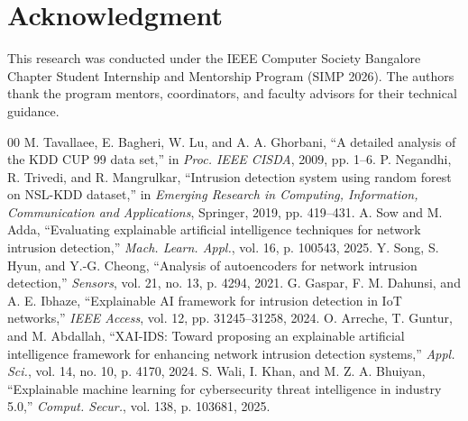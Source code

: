 \documentclass[10pt,twocolumn]{article}
\begin{document}
\section*{Acknowledgment}
This research was conducted under the IEEE Computer Society Bangalore Chapter Student Internship and Mentorship Program (SIMP 2026). The authors thank the program mentors, coordinators, and faculty advisors for their technical guidance.

\begin{thebibliography}{00}
 M. Tavallaee, E. Bagheri, W. Lu, and A. A. Ghorbani, ``A detailed analysis of the KDD CUP 99 data set,'' in \textit{Proc. IEEE CISDA}, 2009, pp. 1--6.
 P. Negandhi, R. Trivedi, and R. Mangrulkar, ``Intrusion detection system using random forest on NSL-KDD dataset,'' in \textit{Emerging Research in Computing, Information, Communication and Applications}, Springer, 2019, pp. 419--431.
 A. Sow and M. Adda, ``Evaluating explainable artificial intelligence techniques for network intrusion detection,'' \textit{Mach. Learn. Appl.}, vol. 16, p. 100543, 2025.
 Y. Song, S. Hyun, and Y.-G. Cheong, ``Analysis of autoencoders for network intrusion detection,'' \textit{Sensors}, vol. 21, no. 13, p. 4294, 2021.
 G. Gaspar, F. M. Dahunsi, and A. E. Ibhaze, ``Explainable AI framework for intrusion detection in IoT networks,'' \textit{IEEE Access}, vol. 12, pp. 31245--31258, 2024.
 O. Arreche, T. Guntur, and M. Abdallah, ``XAI-IDS: Toward proposing an explainable artificial intelligence framework for enhancing network intrusion detection systems,'' \textit{Appl. Sci.}, vol. 14, no. 10, p. 4170, 2024.
 S. Wali, I. Khan, and M. Z. A. Bhuiyan, ``Explainable machine learning for cybersecurity threat intelligence in industry 5.0,'' \textit{Comput. Secur.}, vol. 138, p. 103681, 2025.
\end{thebibliography}
\end{document}
